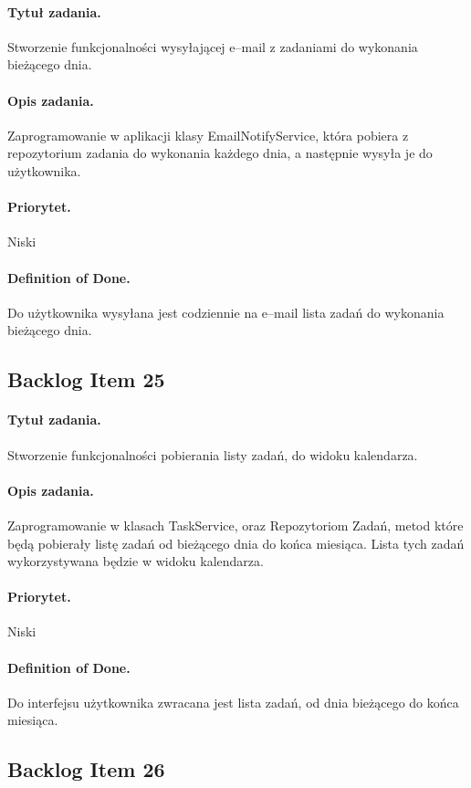\documentclass[a4paper]{article}
\begin{document}
\paragraph{Tytuł zadania.} Stworzenie funkcjonalności wysyłającej e--mail z zadaniami do wykonania bieżącego dnia.
\paragraph{Opis zadania.} Zaprogramowanie w aplikacji klasy EmailNotifyService, która pobiera z repozytorium zadania do wykonania każdego dnia, a następnie wysyła je do użytkownika.
\paragraph{Priorytet.} Niski
\paragraph{Definition of Done.} Do użytkownika wysyłana jest codziennie na e--mail lista zadań do wykonania bieżącego dnia.


\subsection{Backlog Item 25} 
\paragraph{Tytuł zadania.}  Stworzenie funkcjonalności pobierania listy zadań, do widoku kalendarza.
\paragraph{Opis zadania.} Zaprogramowanie w klasach TaskService, oraz Repozytoriom Zadań, metod które będą pobierały listę zadań od bieżącego dnia do końca miesiąca. Lista tych zadań wykorzystywana będzie w widoku kalendarza.
\paragraph{Priorytet.} Niski
\paragraph{Definition of Done.} Do interfejsu użytkownika zwracana jest lista zadań, od dnia bieżącego do końca miesiąca. 

\subsection{Backlog Item 26} 
\end{document}

